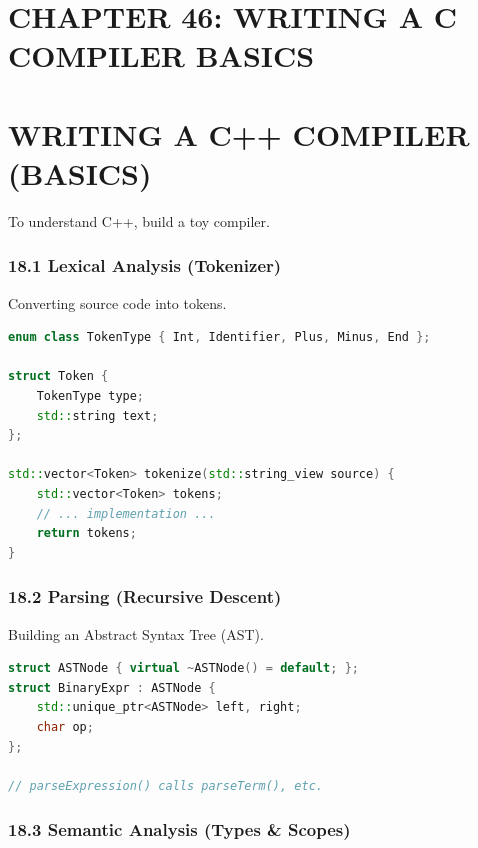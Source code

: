 \hypertarget{chapter-46-writing-a-c-compiler-basics}{%
\section{CHAPTER 46: WRITING A C COMPILER
BASICS}\label{chapter-46-writing-a-c-compiler-basics}}

\hypertarget{writing-a-c-compiler-basics}{%
\section{WRITING A C++ COMPILER
(BASICS)}\label{writing-a-c-compiler-basics}}

To understand C++, build a toy compiler.

\hypertarget{lexical-analysis-tokenizer}{%
\subsubsection{18.1 Lexical Analysis
(Tokenizer)}\label{lexical-analysis-tokenizer}}

Converting source code into tokens.

\begin{lstlisting}[language={C++}]
enum class TokenType { Int, Identifier, Plus, Minus, End };

struct Token {
    TokenType type;
    std::string text;
};

std::vector<Token> tokenize(std::string_view source) {
    std::vector<Token> tokens;
    // ... implementation ...
    return tokens;
}
\end{lstlisting}

\hypertarget{parsing-recursive-descent}{%
\subsubsection{18.2 Parsing (Recursive
Descent)}\label{parsing-recursive-descent}}

Building an Abstract Syntax Tree (AST).

\begin{lstlisting}[language={C++}]
struct ASTNode { virtual ~ASTNode() = default; };
struct BinaryExpr : ASTNode {
    std::unique_ptr<ASTNode> left, right;
    char op;
};

// parseExpression() calls parseTerm(), etc.
\end{lstlisting}

\hypertarget{semantic-analysis-types-scopes}{%
\subsubsection{18.3 Semantic Analysis (Types \&
Scopes)}\label{semantic-analysis-types-scopes}}

